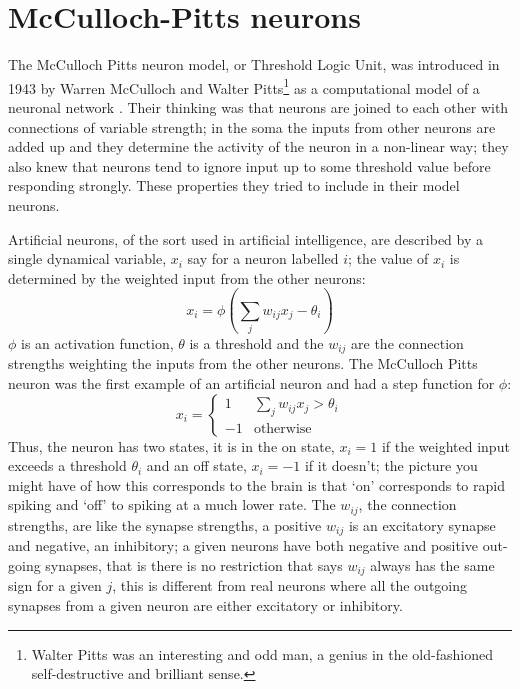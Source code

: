 \documentclass[12pt]{article}
\begin{document}
\section*{McCulloch-Pitts neurons} 

The McCulloch Pitts neuron model, or Threshold Logic Unit, was
introduced in 1943 by Warren McCulloch and Walter
Pitts\footnote{Walter Pitts was an interesting and odd man, a genius
in the old-fashioned self-destructive and brilliant sense.} as a
computational model of a neuronal network
\cite{McCullochPitts1943}. Their thinking was that neurons are joined
to each other with connections of variable strength; in the soma the
inputs from other neurons are added up and they determine the activity
of the neuron in a non-linear way; they also knew that neurons tend to
ignore input up to some threshold value before responding
strongly. These properties they tried to include in their model
neurons.

Artificial neurons, of the sort used in artificial intelligence, are
described by a single dynamical variable, $x_i$ say for a neuron
labelled $i$; the value of $x_i$ is determined by the weighted input
from the other neurons:
\begin{equation}
x_i=\phi\left(\sum_j w_{ij} x_j-\theta_i\right)
\end{equation}
$\phi$ is an activation function, $\theta$ is a threshold and the
$w_{ij}$ are the connection strengths weighting the inputs from the
other neurons. The McCulloch Pitts neuron was the first example of an
artificial neuron and had a step function for $\phi$:
\begin{equation}
x_i=\left\{\begin{array}{ll}1&\sum_j w_{ij} x_j>\theta_i\\-1&\mbox{otherwise}\end{array}\right.
\end{equation}
Thus, the neuron has two states, it is in the on state, $x_i=1$ if the
weighted input exceeds a threshold $\theta_i$ and an off state,
$x_i=-1$ if it doesn't; the picture you might have of how this
corresponds to the brain is that \lq{}on\rq{} corresponds to rapid
spiking and \lq{}off\rq{} to spiking at a much lower rate. The
$w_{ij}$, the connection strengths, are like the synapse strengths, a
positive $w_{ij}$ is an excitatory synapse and negative, an
inhibitory; a given neurons have both negative and positive
out-going synapses, that is there is no restriction that says $w_{ij}$
always has the same sign for a given $j$, this is different from real
neurons where all the outgoing synapses from a given neuron are either
excitatory or inhibitory.
\end{document}
